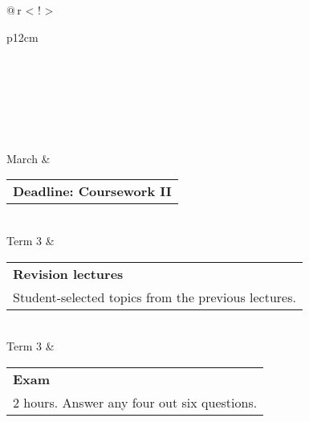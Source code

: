 \begin{longtable}{@{\,}r <{\hskip 2pt} !{\foo} >{\raggedright\arraybackslash}p{12cm}}
		 \\
		 \\
		 \\
		 \\
		 \\
		 \\
		 March & \begin{tabular}{p{13cm}}
			\textbf{Deadline: Coursework II} 
		\end{tabular}\\
		\hline
		Term 3 & \begin{tabular}{p{13cm}}
			\textbf{Revision lectures}  \\
			Student-selected topics from the previous lectures.
		\end{tabular}\\
		Term 3 & \begin{tabular}{p{13cm}}
			\textbf{Exam}  \\
			2 hours. Answer any four out six questions.
		\end{tabular}
	\end{longtable}
\endgroup